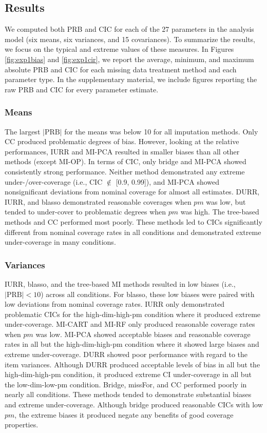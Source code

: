 \subsection{Results}
	
	We computed both PRB and CIC for each of the 27 parameters in the analysis model (six means, six variances,
	and 15 covariances).
	To summarize the results, we focus on the typical and extreme values of these measures.
	In Figures \ref{fig:exp1bias} and \ref{fig:exp1cir}, we report the average, minimum, and maximum absolute PRB 
	and CIC for each missing data treatment method and each parameter type.
	In the supplementary material, we include figures reporting the raw PRB and CIC for every parameter estimate.

	\subsubsection{Means} 
	The largest $|\text{PRB}|$ for the means was below 10 for all 
	imputation methods. Only CC produced problematic degrees of bias.
	However, looking at the relative performances, IURR and MI-PCA resulted in smaller biases than all other methods 
	(except MI-OP).
	In terms of CIC, only bridge and MI-PCA showed consistently strong performance. Neither method demonstrated any extreme under-/over-coverage (i.e., CIC $\notin$ [0.9, 0.99]), and MI-PCA showed nonsignificant deviations from nominal coverage for 
	almost all estimates. DURR, IURR, and blasso demonstrated reasonable coverages when $pm$ was low, but tended to under-cover to problematic degrees when $pm$ was high.
	The tree-based methods and CC performed most poorly. These methods led to CICs significantly different from nominal coverage rates
	in all conditions and demonstrated extreme under-coverage in many conditions.

	\subsubsection{Variances} 
	IURR, blasso, and the tree-based MI methods resulted in low
	biases (i.e., $|\text{PRB}|< 10$) across all conditions.
	For blasso, these low biases were paired with low deviations from nominal coverage rates. IURR only demonstrated problematic CICs for the high-dim-high-pm
	condition where it produced extreme under-coverage. MI-CART and MI-RF only produced reasonable coverage rates when $pm$ was low. MI-PCA showed acceptable biases and reasonable coverage rates in all but the high-dim-high-pm condition where it showed large biases and extreme under-coverage. DURR showed poor performance with regard to the item variances. Although DURR produced acceptable levels of bias in all but the high-dim-high-pm condition, it produced extreme CI under-coverage in all but the low-dim-low-pm condition. Bridge, missFor, and CC performed poorly in nearly all conditions. These methods tended to demonstrate substantial biases and extreme under-coverage. Although bridge produced reasonable CICs with low $pm$, the extreme biases it produced negate any benefits of good coverage properties.

